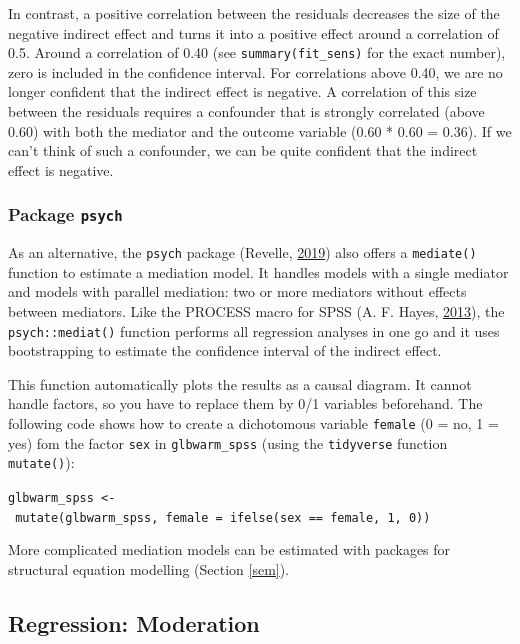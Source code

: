\documentclass[doc,floatsintext]{apa6}
\begin{document}
In contrast, a positive correlation between the residuals decreases the
size of the negative indirect effect and turns it into a positive effect
around a correlation of 0.5. Around a correlation of 0.40 (see
\texttt{summary(fit\_sens)} for the exact number), zero is included in
the confidence interval. For correlations above 0.40, we are no longer
confident that the indirect effect is negative. A correlation of this
size between the residuals requires a confounder that is strongly
correlated (above 0.60) with both the mediator and the outcome variable
(0.60 * 0.60 = 0.36). If we can't think of such a confounder, we can be
quite confident that the indirect effect is negative.

\subsubsection{\texorpdfstring{Package
\texttt{psych}}{Package psych}}\label{package-psych}

As an alternative, the \texttt{psych} package (Revelle,
\protect\hyperlink{ref-R-psych}{2019}) also offers a \texttt{mediate()}
function to estimate a mediation model. It handles models with a single
mediator and models with parallel mediation: two or more mediators
without effects between mediators. Like the PROCESS macro for SPSS (A.
F. Hayes,
\protect\hyperlink{ref-HayesIntroductionMediationModeration2013}{2013}),
the \texttt{psych::mediat()} function performs all regression analyses
in one go and it uses bootstrapping to estimate the confidence interval
of the indirect effect.

This function automatically plots the results as a causal diagram. It
cannot handle factors, so you have to replace them by 0/1 variables
beforehand. The following code shows how to create a dichotomous
variable \texttt{female} (0 = no, 1 = yes) fom the factor \texttt{sex}
in \texttt{glbwarm\_spss} (using the \texttt{tidyverse} function
\texttt{mutate()}):

\texttt{glbwarm\_spss\ \textless{}-\ mutate(glbwarm\_spss,\ female\ =\ ifelse(sex\ ==\ \textquotesingle{}female\textquotesingle{},\ 1,\ 0))}

More complicated mediation models can be estimated with packages for
structural equation modelling (Section \ref{sem}).

\subsection{Regression: Moderation}\label{regression-moderation}
\end{document}
